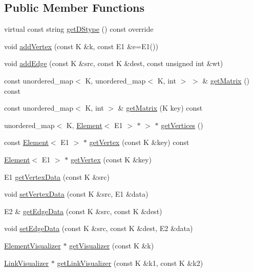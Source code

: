 \subsection*{Public Member Functions}
\begin{DoxyCompactItemize}
\item 
virtual const string \mbox{\hyperlink{classbridges_1_1_graph_adj_matrix_a9b379d65e61755be82bbed01885f1367}{get\+D\+Stype}} () const override
\item 
void \mbox{\hyperlink{classbridges_1_1_graph_adj_matrix_a613fc91a0e056254192e45810405ac6e}{add\+Vertex}} (const K \&k, const E1 \&e=E1())
\item 
void \mbox{\hyperlink{classbridges_1_1_graph_adj_matrix_a785f15a8ca7857a72c34e51ae0c24834}{add\+Edge}} (const K \&src, const K \&dest, const unsigned int \&wt)
\item 
const unordered\+\_\+map$<$ K, unordered\+\_\+map$<$ K, int $>$ $>$ \& \mbox{\hyperlink{classbridges_1_1_graph_adj_matrix_aef5c14842d7b8b83037dc63bfd447259}{get\+Matrix}} () const
\item 
const unordered\+\_\+map$<$ K, int $>$ \& \mbox{\hyperlink{classbridges_1_1_graph_adj_matrix_a46658c5299cfa6b764fafec321ed2fb3}{get\+Matrix}} (K key) const
\item 
unordered\+\_\+map$<$ K, \mbox{\hyperlink{classbridges_1_1_element}{Element}}$<$ E1 $>$ $\ast$ $>$ $\ast$ \mbox{\hyperlink{classbridges_1_1_graph_adj_matrix_a83f79301ef6807c2a40f288c808f758b}{get\+Vertices}} ()
\item 
const \mbox{\hyperlink{classbridges_1_1_element}{Element}}$<$ E1 $>$ $\ast$ \mbox{\hyperlink{classbridges_1_1_graph_adj_matrix_a2c4a30800ec98eab89a23aabf0549869}{get\+Vertex}} (const K \&key) const
\item 
\mbox{\hyperlink{classbridges_1_1_element}{Element}}$<$ E1 $>$ $\ast$ \mbox{\hyperlink{classbridges_1_1_graph_adj_matrix_a5a565f419080f4aea685a89c98223920}{get\+Vertex}} (const K \&key)
\item 
E1 \mbox{\hyperlink{classbridges_1_1_graph_adj_matrix_a11be29f76acebc6fd9a495ba81dc883d}{get\+Vertex\+Data}} (const K \&src)
\item 
void \mbox{\hyperlink{classbridges_1_1_graph_adj_matrix_a0dcc7220d850052aea47fccfd52192e0}{set\+Vertex\+Data}} (const K \&src, E1 \&data)
\item 
E2 \& \mbox{\hyperlink{classbridges_1_1_graph_adj_matrix_abbbb63d19c803973b51aa4379731e177}{get\+Edge\+Data}} (const K \&src, const K \&dest)
\item 
void \mbox{\hyperlink{classbridges_1_1_graph_adj_matrix_ab078dbb442bbbb028568a4f724289a48}{set\+Edge\+Data}} (const K \&src, const K \&dest, E2 \&data)
\item 
\mbox{\hyperlink{classbridges_1_1_element_visualizer}{Element\+Visualizer}} $\ast$ \mbox{\hyperlink{classbridges_1_1_graph_adj_matrix_a895b044adb939413fc695c15415b848b}{get\+Visualizer}} (const K \&k)
\item 
\mbox{\hyperlink{classbridges_1_1_link_visualizer}{Link\+Visualizer}} $\ast$ \mbox{\hyperlink{classbridges_1_1_graph_adj_matrix_a52652abff91b98257e17aea6f9560128}{get\+Link\+Visualizer}} (const K \&k1, const K \&k2)
\end{DoxyCompactItemize}


